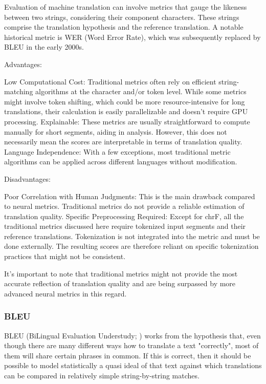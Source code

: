 Evaluation of machine translation can involve metrics that gauge the likeness between two strings, considering their component characters. These strings comprise the translation hypothesis and the reference translation. A notable historical metric is WER (Word Error Rate), which was subsequently replaced by BLEU in the early 2000s.


Advantages:

    Low Computational Cost: Traditional metrics often rely on efficient string-matching algorithms at the character and/or token level. While some metrics might involve token shifting, which could be more resource-intensive for long translations, their calculation is easily parallelizable and doesn't require GPU processing.
    Explainable: These metrics are usually straightforward to compute manually for short segments, aiding in analysis. However, this does not necessarily mean the scores are interpretable in terms of translation quality.
    Language Independence: With a few exceptions, most traditional metric algorithms can be applied across different languages without modification.

Disadvantages:

    Poor Correlation with Human Judgments: This is the main drawback compared to neural metrics. Traditional metrics do not provide a reliable estimation of translation quality.
    Specific Preprocessing Required: Except for chrF, all the traditional metrics discussed here require tokenized input segments and their reference translations. Tokenization is not integrated into the metric and must be done externally. The resulting scores are therefore reliant on specific tokenization practices that might not be consistent.

It's important to note that traditional metrics might not provide the most accurate reflection of translation quality and are being surpassed by more advanced neural metrics in this regard.




\subsubsection{BLEU}
BLEU (BiLingual Evaluation Understudy; \cite{bleu}) works from the hypothesis that, even though there are many different
ways how to translate a text "correctly", most of them will share certain phrases in common. If this is correct, then it should
be possible to model statistically a quasi ideal of that text against which translations can be compared in relatively simple 
string-by-string matches. 

